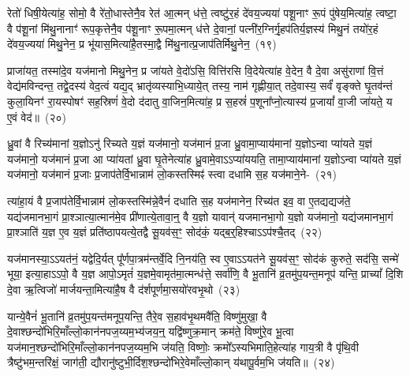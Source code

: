 रेतो॑ धिषी॒येत्या॑ह॒ सोमो॒ वै रे॑तो॒धास्तेनै॒व रेत॑ आ॒त्मन् ध॑त्ते॒ त्वष्टु॑र॒हं दे॑वय॒ज्यया॑ पशू॒नाꣳ रू॒पं पु॑षेय॒मित्या॑ह॒ त्वष्टा॒ वै प॑शू॒नां मि॑थु॒नानाꣳ॑ रूप॒कृत्तेनै॒व प॑शू॒नाꣳ रू॒पमा॒त्मन् ध॑त्ते दे॒वानां॒ पत्नी॑र॒ग्निर्गृ॒हप॑तिर्य॒ज्ञस्य॑ मिथु॒नं तयो॑र॒हं दे॑वय॒ज्यया॑ मिथु॒नेन॒ प्र भू॑यास॒मित्या॑है॒तस्मा॒द्वै मि॑थु॒नात्प्र॒जा\-प॑तिर्मिथु॒नेन॒~(१९)

प्राजा॑यत॒ तस्मा॑दे॒व यज॑मानो मिथु॒नेन॒ प्र जा॑यते वे॒दो॑\-ऽसि॒ वित्ति॑रसि वि॒देयेत्या॑ह वे॒देन॒ वै दे॒वा असु॑राणां वि॒त्तं वेद्य॑मविन्दन्त॒ तद्वे॒दस्य॑ वेद॒त्वं यद्य॒द् भ्रातृ॑व्यस्याभि॒ध्याये॒त् तस्य॒ नाम॑ गृह्णीया॒त् तदे॒वास्य॒ सर्वं॑ वृङ्क्ते घृ॒तव॑न्तं कुला॒यिनꣳ॑ रा॒यस्पोषꣳ॑ सह॒स्रिणं॑ वे॒दो द॑दातु वा॒जिन॒मित्या॑ह॒ प्र स॒हस्रं॑ प॒शूना᳚प्नो॒त्यास्य॑ प्र॒जायां᳚ वा॒जी जा॑यते॒ य ए॒वं वेद॑॥~(२०)

{\anuvakamend[{द॒र्॒\mbox{}श॒पू॒र्ण॒मा॒सयो॑रुभ॒यतो॑ देवा॒श्वाः सु॒रेताः᳚ प्र॒जा\-प॑तिर्मिथु॒नेना᳚\-ऽ\-ऽप्नोत्य॒ष्टौ च॑}]}%

ध्रु॒वां वै रिच्य॑मानां य॒ज्ञो\-ऽनु॑ रिच्यते य॒ज्ञं यज॑मानो॒ यज॑मानं प्र॒जा ध्रु॒वामा॒प्याय॑मानां य॒ज्ञो\-ऽन्वा प्या॑यते य॒ज्ञं यज॑मानो॒ यज॑मानं प्र॒जा आ प्या॑यतां ध्रु॒वा घृ॒तेनेत्या॑ह ध्रु॒वामे॒वा\-ऽ\-ऽप्या॑ययति॒ तामा॒प्याय॑मानां य॒ज्ञो\-ऽन्वा प्या॑यते य॒ज्ञं यज॑मानो॒ यज॑मानं प्र॒जाः प्र॒जाप॑तेर्वि॒भान्नाम॑ लो॒कस्तस्मिꣴ॑ स्त्वा दधामि स॒ह यज॑माने॒ने-~(२१)

त्या॑हा॒यं वै प्र॒जाप॑तेर्वि॒भान्नाम॑ लो॒कस्तस्मि॑न्ने॒वैनं॑ दधाति स॒ह यज॑मानेन॒ रिच्य॑त इव॒ वा ए॒तद्यद्यज॑ते॒ यद्य॑जमानभा॒गं प्रा॒श्ञात्या॒त्मान॑मे॒व प्री॑णात्ये॒तावा॒न्॒ वै य॒ज्ञो यावान्॑ यजमानभा॒गो य॒ज्ञो यज॑मानो॒ यद्य॑जमानभा॒गं प्रा॒श्ञाति॑ य॒ज्ञ ए॒व य॒ज्ञं प्रति॑ष्ठापयत्ये॒तद्वै सू॒यव॑स॒ꣳ॒ सोद॑कं॒ यद्ब॒र्॒\mbox{}हिश्चा\-ऽ\-ऽप॑श्चै॒तद्~(२२)

यज॑मानस्या॒\-ऽ\-ऽयत॑नं॒ यद्वेदि॒र्यत् पू᳚र्णपा॒त्रम॑न्तर्वे॒दि नि॒नय॑ति॒ स्व ए॒वा\-ऽ\-ऽयत॑ने सू॒यव॑स॒ꣳ॒ सोद॑कं कुरुते॒ सद॑सि॒ सन्मे॑ भूया॒ इत्या॒हा\-ऽ\-ऽपो॒ वै य॒ज्ञ आपो॒\-ऽमृतं॑ य॒ज्ञमे॒वामृत॑मा॒त्मन्ध॑त्ते॒ सर्वा॑णि॒ वै भू॒तानि॑ व्र॒तमु॑प॒यन्त॒मनूप॑ यन्ति॒ प्राच्यां᳚ दि॒शि दे॒वा ऋ॒त्विजो॑ मार्जयन्ता॒मित्या॑है॒ष वै द॑र्\mbox{}शपूर्णमा॒सयो॑रवभृ॒थो~(२३)

यान्ये॒वैनं॑ भू॒तानि॑ व्र॒तमु॑प॒यन्त॑मनूप॒यन्ति॒ तैरे॒व स॒हाव॑भृ॒थमवै॑ति॒ विष्णु॑मुखा॒ वै दे॒वाश्छन्दो॑भिरि॒माँल्लो॒कान॑नप\-ज॒य्यम॒भ्य॑जय॒न्॒ यद्वि॑ष्णुक्र॒मान् क्रम॑ते॒ विष्णु॑रे॒व भू॒त्वा यज॑मान॒श्छन्दो॑भि\-रि॒माँल्लो॒का\-न॑नप\-ज॒य्य\-म॒भि ज॑यति॒ विष्णोः॒ क्रमो᳚\-ऽस्यभिमाति॒हेत्या॑ह गाय॒त्री वै पृ॑थि॒वी त्रैष्टु॑भम॒न्तरि॑क्षं॒ जाग॑ती॒ द्यौरानु॑ष्टुभी॒र्दिश॒श्छन्दो॑\-भिरे॒वेमाँल्लो॒कान् य॑थापू॒र्वम॒भि ज॑यति॥~(२४)

